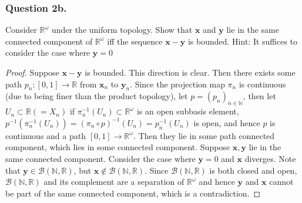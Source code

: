 \documentclass[12pt]{article}
\begin{document}
\subsubsection*{Question 2b.} Consider 
$\mathbb{R}^\omega$ under the uniform topology.
Show that $\mathbf{x}$ and $\mathbf{y}$
lie in the same connected component of $\mathbb{R}^\omega$
iff the sequence
$\mathbf{x} - \mathbf{y}$ is bounded.
Hint: It suffices to consider the case where $\mathbf{y} = 0$
\begin{proof}
    Suppose $\mathbf{x} - \mathbf{y}$ is bounded. This direction is clear.
    Then there exists some path $p_n: [0, 1] \rightarrow \mathbb{R}$
    from $\mathbf{x}_n$ to $\mathbf{y}_n$. Since the 
    projection map $\pi_n$ is continuous 
    (due to being finer than the product topology),
    let $p = (p_n)_{n \in \mathbb{N}}$, then let $U_n \subset \mathbb{R} (= X_n)$
    if $\pi_n^{-1}(U_n) \subset \mathbb{R}^\omega$ is an open subbasis element, 
    $p^{-1}(\pi_n^{-1}(U_n)) = (\pi_n \circ p)^{-1}(U_n) = p_n^{-1}(U_n) $
    is open, and hence $p$ is continuous and a path $[0, 1] \rightarrow \mathbb{R}^\omega$.
    Then they lie in some path connected component, which lies in some connected component.
    Suppose $\mathbf{x}, \mathbf{y}$ lie in the same connected component.
    Consider the case where $\mathbf{y} = 0$ and $\mathbf{x}$ diverges.
    Note that $\mathbf{y} \in \mathcal{B}(\mathbb{N}, \mathbb{R})$,
    but $\mathbf{x} \notin \mathcal{B}(\mathbb{N}, \mathbb{R})$.
    Since $\mathcal{B}(\mathbb{N}, \mathbb{R})$ is both closed and open,
    $\mathcal{B}(\mathbb{N}, \mathbb{R})$ and its complement are a separation
    of $\mathbb{R}^\omega$
    and hence $\mathbf{y}$ and $\mathbf{x}$ cannot be 
    part of the same connected component, which is a contradiction.
\end{proof}


    
\end{document}
